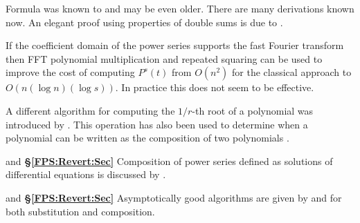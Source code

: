  Formula  was
known to {\Euler} \cite{Euler:Analysis} and may be even older.  There
are many derivations known now.  An elegant proof using properties of
double sums is due to {\Holdt} \cite{vonHoldt:Series}.

If the coefficient domain of the power series supports the fast
Fourier transform then FFT polynomial multiplication and repeated
squaring can be used to improve the cost of computing $P^s(t)$ from
$O(n^2)$ for the classical approach to $O(n (\log n)(\log s))$.  In
practice this does not seem to be effective.

A different algorithm for computing the $1/r$-th root of a polynomial 
was introduced by {\Yun} \cite{Yun76a}.  This operation has also been 
used to determine when a polynomial can be written as the composition of 
two polynomials \cite{Kozen89,Gathen87}.

 and {\bf \S\ref{FPS:Revert:Sec}}
Composition of power series defined as solutions of differential
equations is discussed by {\Norman} \cite{Norman75}.

 and {\bf \S\ref{FPS:Revert:Sec}}
Asymptotically good algorithms are given by {\Brent} and {\Kung}
\cite{Brent78} for both substitution and composition.

\normalsize

